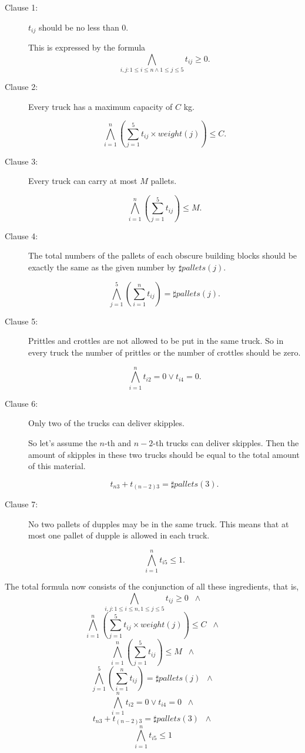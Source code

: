 \documentclass[11pt]{article}
\begin{document}
\begin{description}
  \item[Clause 1:] $t_{ij}$ should be no less than $0$.

  This is expressed by the formula
  \[ \bigwedge_{i,j:1 \leq i \leq n \wedge 1 \leq j \leq 5} t_{ij} \geq 0.\]
  \item[Clause 2:] Every truck has a maximum capacity of $C$ kg.

  \[ \bigwedge_{i=1}^n  (\sum_{j=1}^5 t_{ij} \times weight(j)) \leq C .\]
  \item[Clause 3:] Every truck can carry at most $M$ pallets.

  \[ \bigwedge_{i=1}^n (\sum_{j=1}^5 t_{ij}) \leq M .\]
  \item[Clause 4:] The total numbers of the pallets of each obscure building blocks should be exactly the same as the given number by $\sharp pallets(j)$.

  \[ \bigwedge_{j=1}^5 (\sum_{i=1}^n t_{ij}) = \sharp pallets(j) .\]

  \item[Clause 5:] Prittles and crottles are not allowed to be put in the same truck. So in every truck the number of prittles or the number of crottles should be zero.

  \[ \bigwedge_{i=1}^n t_{i2}=0 \vee t_{i4}=0 .\]
  \item[Clause 6:] Only two of the trucks can deliver skipples.

      So let's assume the $n$-th and $n-2$-th trucks can deliver skipples. Then the amount of skipples in these two trucks should be equal to the total amount of this material.

  \[ t_{n3} + t_{(n-2)3} = \sharp pallets(3) .\]
  \item[Clause 7:] No two pallets of dupples may be in the same truck. This means that at most one pallet of dupple is allowed in each truck.

  \[ \bigwedge_{i=1}^n t_{i5} \leq 1 .\]
\end{description}

The total formula now consists of the conjunction of all these
ingredients, that is,
\[ \bigwedge_{i,j:1 \leq i \leq n, 1 \leq j \leq 5} t_{ij} \geq 0 \;\; \wedge \]
\[ \bigwedge_{i=1}^n  (\sum_{j=1}^5 t_{ij} \times weight(j)) \leq C \;\; \wedge \]
\[ \bigwedge_{i=1}^n (\sum_{j=1}^5 t_{ij}) \leq M \;\; \wedge \]
\[ \bigwedge_{j=1}^5 (\sum_{i=1}^n t_{ij}) = \sharp pallets(j) \;\; \wedge \]
\[ \bigwedge_{i=1}^n t_{i2}=0 \vee t_{i4}=0 \;\; \wedge \]
\[ t_{n3} + t_{(n-2)3} = \sharp pallets(3) \;\; \wedge \]
\[ \bigwedge_{i=1}^n t_{i5} \leq 1 \]
\end{document}
